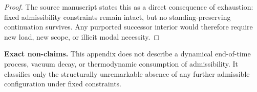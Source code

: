\begin{proof}
The source manuscript states this as a direct consequence of exhaustion: fixed admissibility constraints remain intact, but no standing-preserving continuation survives. Any purported successor interior would therefore require new load, new scope, or illicit modal necessity.\cite{MaleyEndInterior}
\end{proof}

\begin{reviewbox}
\textbf{Exact non-claims.} This appendix does not describe a dynamical end-of-time process, vacuum decay, or thermodynamic consumption of admissibility. It classifies only the structurally unremarkable absence of any further admissible configuration under fixed constraints.\cite{MaleyEndInterior}
\end{reviewbox}
